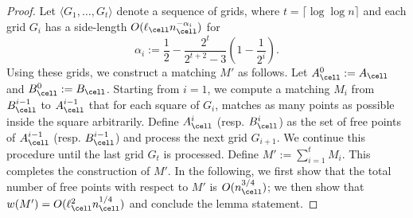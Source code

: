 \GRSPartialMatching*
\begin{proof}
    Let $\langle G_1, \ldots, G_t\rangle$ denote a sequence of grids, where $t=\lceil \log\log n\rceil$ and each grid $G_i$ has a side-length $O(\ell_\cell n_\cell^{-\alpha_i})$ for \[\alpha_i:=\frac{1}{2} - \frac{2^t}{2^{t+2} - 3}\left(1-\frac{1}{2^i}\right).\]
    Using these grids, we construct a matching $M'$ as follows.
    Let $A_\cell^0:=A_\cell$ and $B_\cell^0:=B_\cell$. Starting from $i=1$, we compute a matching $M_i$ from $B_\cell^{i-1}$ to $A_\cell^{i-1}$ that for each square of $G_i$, matches as many points as possible inside the square arbitrarily. Define $A_\cell^i$ (resp. $B_\cell^i$) as the set of free points of $A_\cell^{i-1}$ (resp. $B_\cell^{i-1}$) and process the next grid $G_{i+1}$. We continue this procedure until the last grid $G_t$ is processed. Define $M':=\sum_{i=1}^t M_i$. This completes the construction of $M'$. In the following, we first show that the total number of free points with respect to $M'$ is $O(n_\cell^{3/4})$; we then show that $w(M')=O(\ell_\cell^2n_\cell^{1/4})$ and conclude the lemma statement.


\end{proof}
